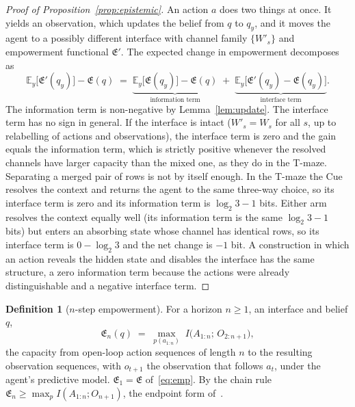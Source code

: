 \documentclass[pdflatex,sn-apa]{sn-jnl}%
\theoremstyle{definition}
\newtheorem{definition}{Definition}
\providecommand{\E}{\mathbb{E}}
\providecommand{\Emp}{\mathfrak{E}}
\begin{document}
\begin{appendices}
\begin{proof}[Proof of Proposition~\ref{prop:epistemic}]
An action $a$ does two things at once. It yields an observation, which updates the belief from $q$ to $q_y$, and it moves the agent to a possibly different interface with channel family $\{W'_s\}$ and empowerment functional $\Emp'$. The expected change in empowerment decomposes as
\begin{equation}
  \E_y\big[\Emp'(q_y)\big] - \Emp(q)
  \;=\;
  \underbrace{\E_y\big[\Emp(q_y)\big] - \Emp(q)}_{\text{information term}}
  \;+\;
  \underbrace{\E_y\big[\Emp'(q_y) - \Emp(q_y)\big]}_{\text{interface term}} .
  \label{eq:decomp}
\end{equation}
The information term is non-negative by Lemma~\ref{lem:update}. The interface term has no sign in general. If the interface is intact ($W'_s = W_s$ for all $s$, up to relabelling of actions and observations), the interface term is zero and the gain equals the information term, which is strictly positive whenever the resolved channels have larger capacity than the mixed one, as they do in the T-maze. Separating a merged pair of rows is not by itself enough. In the T-maze the Cue resolves the context and returns the agent to the same three-way choice, so its interface term is zero and its information term is $\log_2 3 - 1$ bits. Either arm resolves the context equally well (its information term is the same $\log_2 3 - 1$ bits) but enters an absorbing state whose channel has identical rows, so its interface term is $0 - \log_2 3$ and the net change is $-1$ bit. A construction in which an action reveals the hidden state and disables the interface has the same structure, a zero information term because the actions were already distinguishable and a negative interface term.
\end{proof}

\begin{definition}[$n$-step empowerment]
For a horizon $n \ge 1$, an interface and belief $q$,
\begin{equation}
  \Emp_n(q) \;=\; \max_{p(a_{1:n})}\; I\big(A_{1:n};\, O_{2:n+1}\big),
\end{equation}
the capacity from open-loop action sequences of length $n$ to the resulting observation sequences, with $o_{t+1}$ the observation that follows $a_t$, under the agent's predictive model. $\Emp_1 = \Emp$ of~\eqref{eq:emp}. By the chain rule $\Emp_n \ge \max_p I(A_{1:n}; O_{n+1})$, the endpoint form of~\citet{Klyubin2005empowerment}.
\end{definition}


\end{appendices}
\end{document}
